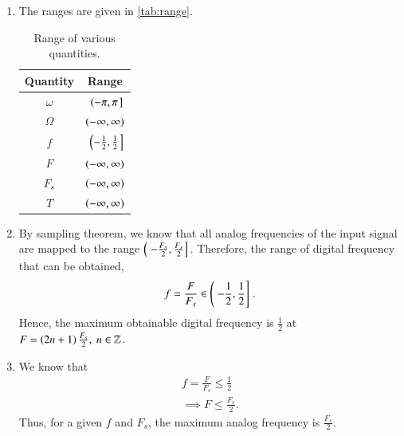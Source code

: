 \documentclass[journal,12pt,twocolumn]{IEEEtran}
\begin{document}
\begin{enumerate}[label=\theenumi.]
\begin{enumerate}
        \item The ranges are given in \autoref{tab:range}.
        \begin{table}[!ht]
            \centering
            \begin{tabular}{|c|c|}
                \hline
                \textbf{Quantity} & \textbf{Range} \\
                \hline
                \(\omega\) & \({}\left.\left(-\pi,\pi\right.\right]\) \\
                \hline
                \(\Omega\) & \(\left(-\infty,\infty\right)\) \\
                \hline
                \(f\) & \({}\left.\left(-\frac{1}{2},\frac{1}{2}\right.\right]\) \\
                \hline
                \(F\) & \(\left(-\infty,\infty\right)\) \\
                \hline
                \(F_s\) & \(\left(-\infty,\infty\right)\) \\
                \hline
                \(T\) & \(\left(-\infty,\infty\right)\) \\
                \hline
            \end{tabular}
            \caption{Range of various quantities.}
            \label{tab:range}
        \end{table}

        \item By sampling theorem, we know that all analog frequencies of the
        input signal are mapped to the range \(\left({}\left.-\frac{F_s}{2},\frac{F_s}{2}\right]\right.\).
        Therefore, the range of digital frequency that can be obtained,
        \begin{equation}
            f = \frac{F}{F_s} \in \left({}\left.-\frac{1}{2}, \frac{1}{2}\right]\right..
            \label{eq:f-range}
        \end{equation}
        Hence, the maximum obtainable digital frequency is \(\frac{1}{2}\)
        at \(F = \left(2n+1\right)\frac{F_s}{2},\ n \in \mathbb{Z}\).

        \item We know that
        \begin{align}
            f = \frac{F}{F_s} \le \frac{1}{2} \\
            \implies F \le \frac{F_s}{2}.
        \end{align}
        Thus, for a given \(f\) and \(F_s\), the maximum analog frequency is
        \(\frac{F_s}{2}\).


\end{enumerate}
\end{enumerate}
\end{document}
